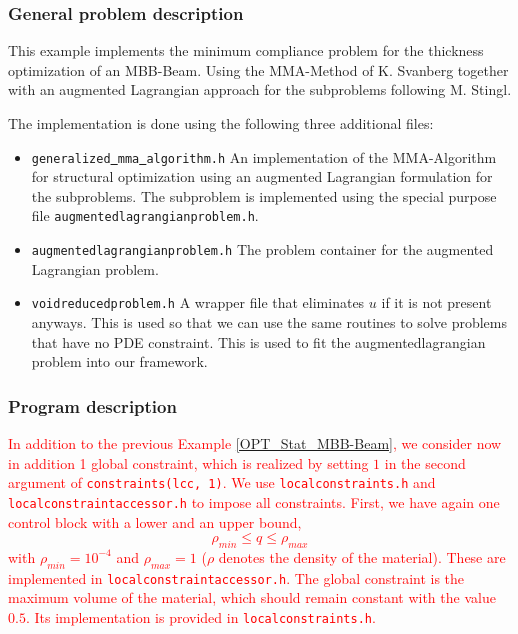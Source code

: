 \subsubsection{General problem description}
This example implements the minimum compliance problem for the thickness optimization 
of an MBB-Beam. Using the MMA-Method of K. Svanberg together with an augmented Lagrangian 
approach for the subproblems following M. Stingl.

The implementation is done using the following three additional files:

\begin{itemize}
\item \texttt{generalized\underline{ }mma\underline{ }algorithm.h}
  An implementation of the MMA-Algorithm for structural optimization using an augmented
  Lagrangian formulation for the subproblems. The subproblem is implemented using the 
  special purpose\\ file \texttt{augmentedlagrangianproblem.h}.
\item \texttt{augmentedlagrangianproblem.h} The problem container 
  for the augmented Lagrangian problem.
\item \texttt{voidreducedproblem.h} A wrapper file that eliminates $u$ 
  if it is not present anyways. This is used so that we can use the same routines to 
  solve problems that have no PDE constraint. This is used to fit the augmentedlagrangian 
  problem into our framework.
\end{itemize}


\subsubsection{Program description}
\textcolor{red}{
In addition to the previous Example \ref{OPT_Stat_MBB-Beam}, we consider now 
in addition 1 global constraint, which is realized by setting $1$ in the 
second argument of \texttt{constraints(lcc, 1)}. 
We use 
\texttt{localconstraints.h} and \texttt{localconstraintaccessor.h} to impose 
all constraints. First, we have again one control block with a lower and 
an upper bound, 
\[
\rho_{min} \leq q \leq \rho_{max}
\]
with $\rho_{min} = 10^{-4}$ and $\rho_{max} = 1$ ($\rho$ denotes the density
of the material). These are implemented in \texttt{localconstraintaccessor.h}.
The global constraint is the maximum volume of the material,
which should remain constant with the value $0.5$. Its implementation is 
provided in \texttt{localconstraints.h}.
}

